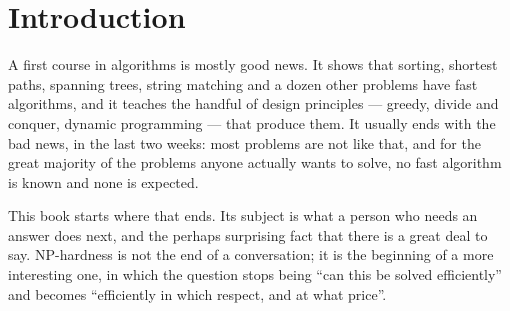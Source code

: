 
\chapter{Introduction}
\label{ch:introduction}

A first course in algorithms is mostly good news. It shows that sorting,
shortest paths, spanning trees, string matching and a dozen other problems have
fast algorithms, and it teaches the handful of design principles --- greedy,
divide and conquer, dynamic programming --- that produce them. It usually ends
with the bad news, in the last two weeks: most problems are not like that, and
for the great majority of the problems anyone actually wants to solve, no fast
algorithm is known and none is expected.

This book starts where that ends. Its subject is what a person who needs an
answer does next, and the perhaps surprising fact that there is a great deal to
say. \textrm{NP}-hardness is not the end of a conversation; it is the beginning
of a more interesting one, in which the question stops being ``can this be
solved efficiently'' and becomes ``efficiently in which respect, and at what
price''.

\begin{goals}
\end{goals}

